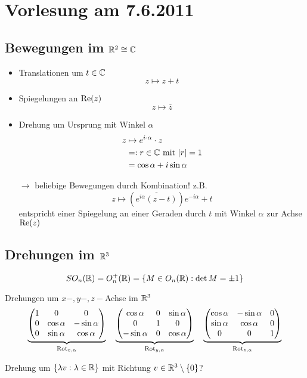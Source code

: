 \section*{Vorlesung am 7.6.2011} %
\label{sec:Vorlesung am 7.6.2011}

\subsection*{Bewegungen im $\mathbb R^2 \cong \mathbb C$} %

\begin{itemize}
	\item Translationen um $t \in \mathbb C$
	$$
		z \mapsto z+t
	$$
	\item Spiegelungen an $\operatorname{Re}(z)$
	$$
		z \mapsto \overline{z}
	$$
	\item Drehung um Ursprung mit Winkel $\alpha$
	\begin{align*}
		z & \mapsto e^{i \cdot \alpha} \cdot z\\
		& =: r \in \mathbb C \text{ mit } |r| = 1\\
		& = \cos \alpha + i \sin \alpha
	\end{align*}
	\item[$\to$] beliebige Bewegungen durch Kombination! z.B.
	$$
		z \mapsto \left( \overline{e^{i \alpha} (z-t)} \right) e^{-i \alpha} + t
	$$
	entspricht einer Spiegelung an einer Geraden durch $t$ mit Winkel $\alpha$ zur Achse $\operatorname{Re}(z)$
\end{itemize}


\subsection*{Drehungen im $\mathbb R^3$} %

$$
	SO_n(\mathbb R) = O_n^+(\mathbb R) = \left\{ M \in O_n(\mathbb R) : \det M = \pm 1 \right\}
$$

\begin{bsp}
Drehungen um $x-, y-, z-$Achse im $\mathbb R^3$
$$
	\underbrace{
		\begin{pmatrix}
			1 & 0 & 0\\
			0 & \cos \alpha & - \sin \alpha\\
			0 & \sin \alpha & \cos \alpha
		\end{pmatrix}
	}_{\operatorname{Rot}_{x,\alpha}}
	\quad
	\underbrace{
		\begin{pmatrix}
			\cos \alpha & 0 & \sin \alpha\\
			0 & 1 & 0\\
			- \sin \alpha & 0 & \cos \alpha
		\end{pmatrix}
	}_{\operatorname{Rot}_{y,\alpha}}
	\quad
	\underbrace{
		\begin{pmatrix}
			\cos \alpha & - \sin \alpha & 0\\
			\sin \alpha & \cos \alpha & 0\\
			0 & 0 & 1
		\end{pmatrix}
	}_{\operatorname{Rot}_{z,\alpha}}
$$
\end{bsp}
Drehung um $\left\{ \lambda v : \lambda \in \mathbb R \right\}$ mit Richtung $v \in \mathbb R^3 \setminus \left\{
0 \right\}$?

